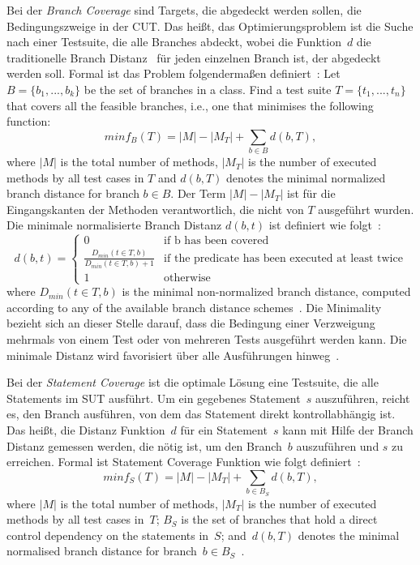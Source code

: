 \documentclass{article}
\begin{document}
Bei der \textit{Branch Coverage} sind Targets, die abgedeckt werden sollen, die Bedingungszweige in der \ac{CUT}. Das heißt, das Optimierungsproblem ist die Suche nach einer Testsuite, die alle Branches abdeckt, wobei die Funktion~$d$ die traditionelle Branch Distanz~\cite{Pacheco_2007} für jeden einzelnen Branch ist, der abgedeckt werden soll. Formal ist das Problem folgendermaßen definiert~\cite{Fraser2014}: Let $B = \{b_1, ..., b_k\}$ be the set of branches in a class. Find a test suite $T = \{t_1, ..., t_n\}$ that covers all the feasible branches, i.e., one that minimises the following function:
\begin{equation}
minf_B(T) = \left|M\right| - \left|M_T\right| + \sum_{b \in B}{d(b, T)},
\end{equation} 
where $\left|M\right|$ is the total number of methods, $\left|M_T\right|$ is the number of executed methods by all test cases in $T$ and $d(b, T)$ denotes the minimal normalized branch distance for branch $b \in B$. Der Term $\left|M\right| - \left|M_T\right|$ ist für die Eingangskanten der Methoden verantwortlich, die nicht von $T$ ausgeführt wurden. Die minimale normalisierte Branch Distanz $d(b, t)$ ist definiert wie folgt~\cite{Fraser_2013}: 
\begin{equation}
d(b, t) = \left\{ \begin{array}{cl}
0 & \textrm{if b has been covered} \\
\frac{D_{min}(t \in T, b)}{D_{min}(t \in T, b) + 1} & \textrm{if the predicate has been executed at least twice} \\
1 & \textrm{otherwise} 
\end{array} \right.
\end{equation}
where $D_{min}(t \in T, b)$ is the minimal non-normalized branch distance, computed according to any of the available branch distance schemes~\cite{McMinn_2004}. Die Minimality bezieht sich an dieser Stelle darauf, dass die Bedingung einer Verzweigung mehrmals von einem Test oder von mehreren Tests ausgeführt werden kann. Die minimale Distanz wird favorisiert über alle Ausführungen hinweg~\cite{Panichella2018}.

Bei der \textit{Statement Coverage} ist die optimale Lösung eine Testsuite, die alle Statements im \ac{SUT} ausführt. Um ein gegebenes Statement~$s$ auszuführen, reicht es, den Branch ausführen, von dem das Statement direkt kontrollabhängig ist. Das heißt, die Distanz Funktion~$d$ für ein Statement~$s$ kann mit Hilfe der Branch Distanz gemessen werden, die nötig ist, um den Branch~$b$ auszuführen und $s$ zu erreichen. Formal ist Statement Coverage Funktion wie folgt definiert~\cite{Fraser_2013}: 
\begin{equation}
minf_S(T) = \left|M\right| - \left|M_T\right| + \sum_{b \in B_S}{d(b, T)},
\end{equation}
where $\left|M\right|$ is the total number of methods, $\left|M_T\right|$ is the number of executed methods by all test cases in~$T$; $B_S$ is the set of branches that hold a direct control dependency on the statements in~$S$; and~$d(b, T)$ denotes the minimal normalised branch distance for branch~$b \in B_S$~\cite{Panichella2018}.
\end{document}
